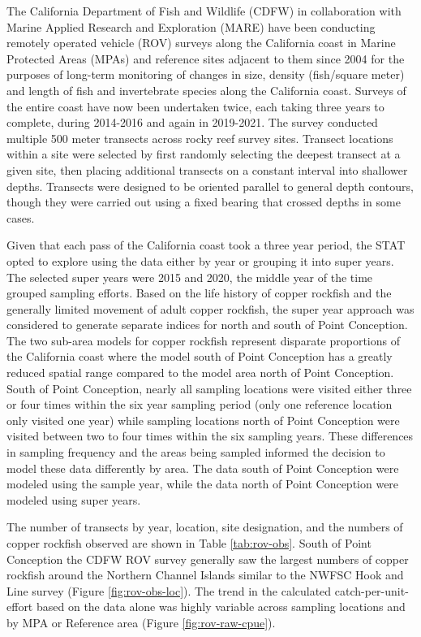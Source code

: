 \documentclass[11pt,
  english,
  letterpaper,
]{article}
\begin{document}
\hfill\break

The California Department of Fish and Wildlife (CDFW) in collaboration with Marine Applied Research and Exploration (MARE) have been conducting remotely operated vehicle (ROV) surveys along the California coast in Marine Protected Areas (MPAs) and reference sites adjacent to them since 2004 for the purposes of long-term monitoring of changes in size, density (fish/square meter) and length of fish and invertebrate species along the California coast. Surveys of the entire coast have now been undertaken twice, each taking three years to complete, during 2014-2016 and again in 2019-2021. The survey conducted multiple 500 meter transects across rocky reef survey sites. Transect locations within a site were selected by first randomly selecting the deepest transect at a given site, then placing additional transects on a constant interval into shallower depths. Transects were designed to be oriented parallel to general depth contours, though they were carried out using a fixed bearing that crossed depths in some cases.

Given that each pass of the California coast took a three year period, the STAT opted to explore using the data either by year or grouping it into super years. The selected super years were 2015 and 2020, the middle year of the time grouped sampling efforts. Based on the life history of copper rockfish and the generally limited movement of adult copper rockfish, the super year approach was considered to generate separate indices for north and south of Point Conception. The two sub-area models for copper rockfish represent disparate proportions of the California coast where the model south of Point Conception has a greatly reduced spatial range compared to the model area north of Point Conception. South of Point Conception, nearly all sampling locations were visited either three or four times within the six year sampling period (only one reference location only visited one year) while sampling locations north of Point Conception were visited between two to four times within the six sampling years. These differences in sampling frequency and the areas being sampled informed the decision to model these data differently by area. The data south of Point Conception were modeled using the sample year, while the data north of Point Conception were modeled using super years.

The number of transects by year, location, site designation, and the numbers of copper rockfish observed are shown in Table \ref{tab:rov-obs}. South of Point Conception the CDFW ROV survey generally saw the largest numbers of copper rockfish around the Northern Channel Islands similar to the NWFSC Hook and Line survey (Figure \ref{fig:rov-obs-loc}). The trend in the calculated catch-per-unit-effort based on the data alone was highly variable across sampling locations and by MPA or Reference area (Figure \ref{fig:rov-raw-cpue}).
\end{document}
